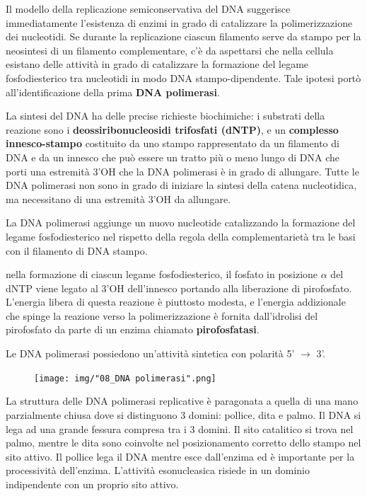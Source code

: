 \documentclass[11pt]{book}
\begin{document}
Il modello della replicazione semiconservativa del DNA suggerisce
immediatamente l'esistenza di enzimi in grado di catalizzare la
polimerizzazione dei nucleotidi. Se durante la replicazione ciascun
filamento serve da stampo per la neosintesi di un filamento
complementare, c'è da aspettarsi che nella cellula esistano delle
attività in grado di catalizzare la formazione del legame
fosfodiesterico tra nucleotidi in modo DNA stampo-dipendente. Tale
ipotesi portò all'identificazione della prima \textbf{DNA polimerasi}.

La sintesi del DNA ha delle precise richieste biochimiche: i substrati
della reazione sono i \textbf{deossiribonucleosidi trifosfati (dNTP)}, e
un \textbf{complesso innesco-stampo} costituito da uno stampo
rappresentato da un filamento di DNA e da un innesco che può essere un
tratto più o meno lungo di DNA che porti una estremità 3'OH che la DNA
polimerasi è in grado di allungare. Tutte le DNA polimerasi non sono in
grado di iniziare la sintesi della catena nucleotidica, ma necessitano
di una estremità 3'OH da allungare.

La DNA polimerasi aggiunge un nuovo nucleotide catalizzando la
formazione del legame fosfodiesterico nel rispetto della regola della
complementarietà tra le basi con il filamento di DNA stampo.

nella formazione di ciascun legame fosfodiesterico, il fosfato in
posizione \(\alpha\) del dNTP viene legato al 3'OH dell'innesco portando
alla liberazione di pirofosfato. L'energia libera di questa reazione è
piuttosto modesta, e l'energia addizionale che spinge la reazione verso
la polimerizzazione è fornita dall'idrolisi del pirofosfato da parte di
un enzima chiamato \textbf{pirofosfatasi}.

Le DNA polimerasi possiedono un'attività sintetica con polarità 5'
\(\rightarrow\) 3'.

\clearpage
\begin{figure}[htp]
\centering
\texttt{[image: img/"08\_DNA polimerasi".png]}
\caption{}
\label{dna-polimerasi}
\end{figure}

La struttura delle DNA polimerasi replicative è paragonata a quella di
una mano parzialmente chiusa dove si distinguono 3 domini: pollice, dita
e palmo. Il DNA si lega ad una grande fessura compresa tra i 3 domini.
Il sito catalitico si trova nel palmo, mentre le dita sono coinvolte nel
posizionamento corretto dello stampo nel sito attivo. Il pollice lega il
DNA mentre esce dall'enzima ed è importante per la processività
dell'enzima. L'attività esonucleasica risiede in un dominio indipendente
con un proprio sito attivo.
\end{document}
